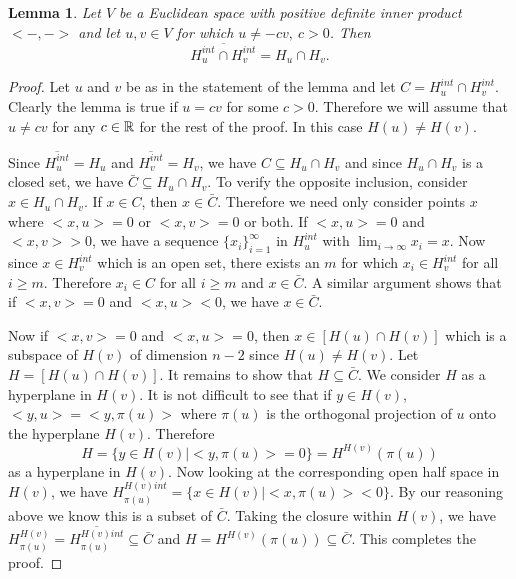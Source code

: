 \documentclass[psamsfonts]{amsart}
\numberwithin{equation}{subsection}
\theoremstyle{plain}
\newtheorem{lemma}[theorem]{Lemma}
\theoremstyle{definition}
\theoremstyle{remark}
\begin{document}
\begin{lemma} \label{closure}Let $V$ be a Euclidean space with positive definite inner product \\$<- , ->$ and let $u, v \in V$ for which $ u \not= -cv, \ c > 0$. Then 
 $$\overline{H_u^{int} \cap H_v^{int}} = H_u \cap H_v.$$
\end{lemma}
\begin{proof} Let $u$ and $v$ be as in the statement of  the lemma and let $C = H_u^{int} \cap H_v^{int}$.
Clearly the lemma is true if $u = cv$ for some $c > 0$. Therefore we will assume that $u \not= cv$ for any $c \in \Bbb{R}$ for the rest of the proof. In this case $H(u) \not= H(v)$. 

 Since $\overline{H_u^{int}} = H_u$ and $\overline{H_v^{int}} = H_v$, we have $C
\subseteq H_{u} \cap H_{v}$ and since $H_{u} \cap H_{v}$ is a closed set, we have $\bar{C} \subseteq H_{u} \cap H_{v}$. 
  To verify the opposite inclusion, consider 
 $x \in H_{u} \cap H_v$. If $x \in C$, then $x \in  \bar{C}$. Therefore we need only consider points $x$ where $<x, u> = 0$ or $<x, v> = 0$ or both. If 
 $<x, u> = 0$ and $<x, v> >  0$, we have a sequence $\{x_i\}_{i = 1}^{\infty}$ in $H_{u}^{int}$ with 
 $\lim_{i \to \infty} x_i = x$. Now since $x \in H_{v}^{int}$ which is an open set, there exists  an $m$ for which  $x_i \in H_{v}^{int}$ for all $i \geq m$. Therefore $x_i \in C$ for all $i \geq m$ and $x \in \bar{C}$. A similar argument shows that 
 if $<x, v>  =   0$ and $<x, u>  < 0$, we have $x \in \bar{C}$. 
 
 Now if $<x, v>  =   0$ and $<x, u>  =  0$, then $x \in [H(u) \cap H(v)]$ which is a subspace of $H(v)$ of dimension $n - 2$ since 
 $H(u) \not= H(v)$. 
 Let $H =  [H(u) \cap H(v)]$. It remains to show that $H \subseteq \bar{C}$. 
 We consider  $H$ as  a hyperplane in $H(v)$. It is not difficult to see that if $y \in H(v)$, $<y, u> = < y, \pi(u)>$ where $\pi(u)$ is the orthogonal projection of  $u$ onto the hyperplane $H(v)$. Therefore 
 $$H = \{y \in H(v) | <y, \pi(u)> = 0 \} = 
 H^{H(v)}(\pi(u))$$
  as a hyperplane in $H(v)$.
  Now looking at the corresponding open half space in  $H(v)$, we have $H_{\pi(u)}^{H(v){int}}  = \{x \in H(v)| <x,\pi(u)> < 0\}$. By our reasoning above we know this is a subset of $\bar{C}$. Taking the closure within $H(v)$, we have 
  $H^{H(v)}_{\pi(u)} = \overline{H_{\pi(u)}^{H(v)int} }\subseteq \bar{C}$  and $H = H^{H(v)}(\pi(u)) 
 \subseteq \bar{C}$. This completes the proof. 
 
 

\end{proof}
\end{document}
